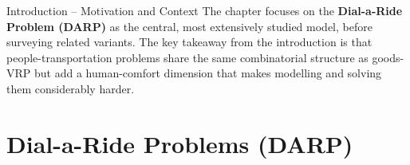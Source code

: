 \documentclass[aspectratio=169,10pt]{beamer}
\begin{document}
\begin{frame}[allowframebreaks]{Introduction – Motivation and Context}
  The chapter focuses on the \textbf{Dial-a-Ride Problem (DARP)} as the
  central, most extensively studied model, before surveying related variants.
  The key takeaway from the introduction is that people-transportation problems
  share the same combinatorial structure as goods-VRP but add a human-comfort
  dimension that makes modelling and solving them considerably harder.

\end{frame}

\section{Dial-a-Ride Problems (DARP)}
\end{document}
